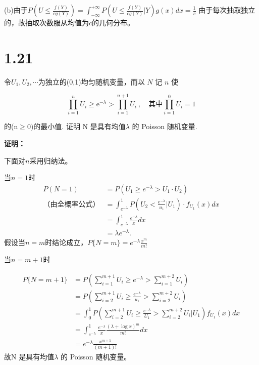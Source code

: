 \documentclass[12pt]{article}
\begin{document}
(b)由于$P(U\leq\frac{f(Y)}{cg(Y)})=\int_{-\infty}^{+\infty}{P(U\leq\frac{f(
Y
)}{cg(Y)}|Y)}g(x)dx=\frac{1}{c}$  
由于每次抽取独立的，故抽取次数服从均值为$c$的几何分布。
\section*{1.21}
令$U_1,U_2,\cdots$为独立的(0,1)均匀随机变量，而以 $N$ 记 $n$ 使

$$\prod_{i=1}^nU_i\geqslant\mathrm{e}^{-\lambda}>\prod_{i=1}^{n+1}U_i\:,\quad\text{其中}\prod_{i=1}^0U_i=1$$

的(n$\geqslant0)$的最小值. 证明 N 是具有均值$\lambda$ 的 Poisson 随机变量.

\textbf{证明：}

下面对$n$采用归纳法。

当$n=1$时$$\begin{aligned}
P(N=1) & =P(U_{1}\geq e^{-\lambda}>U_{1}\cdot U_{2}) \\
\text{（由全概率公式）} & =\int_{e^{-\lambda}}^{1}P(U_{2}<\frac{e^{-\lambda}}{u_{1}}|U_1)\cdot f_{U_1}(x)dx \\
 & =\int_{e^{-\lambda}}^{1}\frac{e^{-\lambda}}{x}dx \\
 & =\lambda e^{-\lambda}.
\end{aligned}$$
假设当$n=m$时结论成立，$P\{N=m\}=e^{-\lambda}\frac{x^{m}}{m!}$

当$n=m+1$时

$$\begin{aligned}
  P\{N=m+1\}&=P(\sum_{i=1}^{m+1}U_{i}\ge e^{-\lambda}>\sum_{i=1}^{m+2}U_{i}) \\
 & =P(\sum_{i=2}^{m+1}U_{i}\geq\frac{e^{-\lambda}}{u_{1}}>\sum_{i=2}^{m+2}U_{i}) \\
 & =\int_{0}^{1}P(\sum_{i=2}^{m+1}U_{i}\geq\frac{e^{-\lambda}}{U_1}>\sum_{i=2}^{m+2}U_{i}|U_{1})f_{U_1}(x)dx \\
 & =\int_{e^{-\lambda}}^{1}\frac{e^{-\lambda}}{x}\frac{(\lambda+\log x)^{m}}{m!}dx \\
 & =e^{-\lambda}\frac{x^{m+1}}{(m+1)!}
\end{aligned}$$
故N 是具有均值$\lambda$ 的 Poisson 随机变量。
\end{document}
